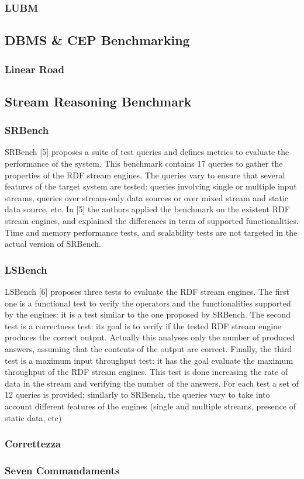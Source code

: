 \subsubsection{LUBM}
\subsection{DBMS \& CEP Benchmarking}
\subsubsection{Linear Road}
\subsection{Stream Reasoning Benchmark}
\subsubsection{SRBench}
SRBench [5] proposes a suite of test queries and defines metrics to evaluate the
performance of the system. This benchmark contains 17 queries to gather the
properties of the RDF stream engines. The queries vary to ensure that several
features of the target system are tested: queries involving single or multiple input
streams, queries over stream-only data sources or over mixed stream and static
data source, etc. In [5] the authors applied the benchmark on the existent RDF
stream engines, and explained the differences in term of supported functionalities.
Time and memory performance tests, and scalability tests are not targeted
in the actual version of SRBench.
\subsubsection{LSBench}
LSBench [6] proposes three tests to evaluate the RDF stream engines. The
first one is a functional test to verify the operators and the functionalities supported
by the engines: it is a test similar to the one proposed by SRBench. The
second test is a correctness test: its goal is to verify if the tested RDF stream
engine produces the correct output. Actually this analyses only the number of
produced answers, assuming that the contents of the output are correct. Finally,
the third test is a maximum input throughput test: it has the goal evaluate the
maximum throughput of the RDF stream engines. This test is done increasing
the rate of data in the stream and verifying the number of the answers. For each
test a set of 12 queries is provided; similarly to SRBench, the queries vary to
take into account different features of the engines (single and multiple streams,
presence of static data, etc)

\subsubsection{Correttezza}
\subsubsection{Seven Commandaments}

